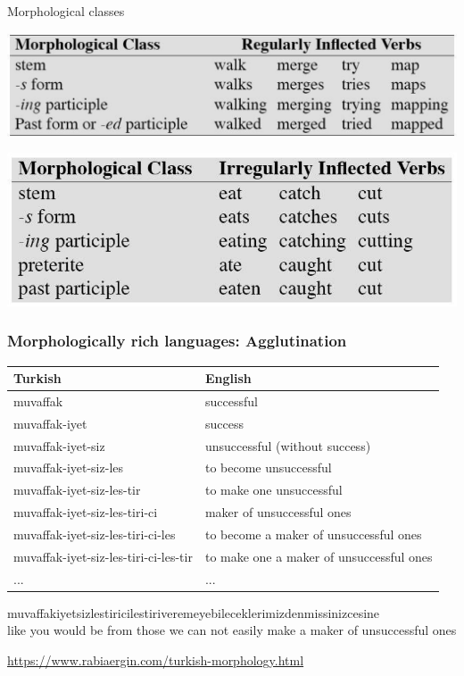 \documentclass{beamer}
\begin{document}
\begin{frame}{Morphological classes}

  \includegraphics[width=.8\textwidth]{figures/morph-class-reg}

  \includegraphics[width=.8\textwidth]{figures/morph-class-irreg}
\end{frame}


\begin{frame}
\frametitle{Morphologically rich languages: Agglutination}
\small
\begin{tabular}{l|l}
Turkish & English\\
\hline
muvaffak & successful \\
muvaffak-iyet & success\\ 
muvaffak-iyet-siz & unsuccessful (without success) \\
muvaffak-iyet-siz-les & to become unsuccessful \\
muvaffak-iyet-siz-les-tir & to make one unsuccessful \\
muvaffak-iyet-siz-les-tiri-ci & maker of unsuccessful ones \\
muvaffak-iyet-siz-les-tiri-ci-les & to become a maker of unsuccessful ones \\
muvaffak-iyet-siz-les-tiri-ci-les-tir & to make one a maker of unsuccessful ones \\
... & ... \\
\end{tabular}

{\tiny
  muvaffakiyetsizlestiricilestiriveremeyebileceklerimizdenmissinizcesine
  \\ like you would be from those we can not easily make a maker of
  unsuccessful ones}

\url{https://www.rabiaergin.com/turkish-morphology.html}
\end{frame}
\end{document}
